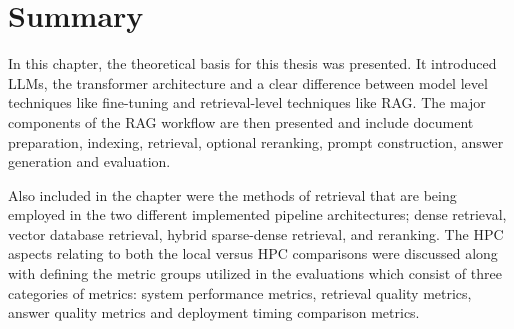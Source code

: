 \section{Summary}

In this chapter, the theoretical basis for this thesis was presented. It introduced \acfp{LLM}, the transformer architecture and a clear difference between model level techniques like fine-tuning and retrieval-level techniques like \acf{RAG}. The major components of the \ac{RAG} workflow are then presented and include document preparation, indexing, retrieval, optional reranking, prompt construction, answer generation and evaluation.

Also included in the chapter were the methods of retrieval that are being employed in the two different implemented pipeline architectures; dense retrieval, vector database retrieval, hybrid sparse-dense retrieval, and reranking. The \acf{HPC} aspects relating to both the local versus \ac{HPC} comparisons were discussed along with defining the metric groups utilized in the evaluations which consist of three categories of metrics: system performance metrics, retrieval quality metrics, answer quality metrics and deployment timing comparison metrics.